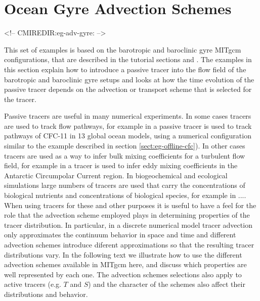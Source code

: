 


\section[Gyre Advection Example]{Ocean Gyre Advection Schemes}
\label{www:tutorials}
\label{sect:eg-adv-gyre}
\begin{rawhtml}
<!-- CMIREDIR:eg-adv-gyre: -->
\end{rawhtml}

This set of examples is based on the barotropic and baroclinic gyre MITgcm configurations,
that are described in the tutorial sections \label{sect:eg-baro} and \label{sect:eg-fourlayer}. 
The examples in this section explain how to introduce a passive tracer into the flow 
field of the barotropic and baroclinic gyre setups and looks at how the time evolution
of the passive tracer depends on the advection or transport scheme that is selected 
for the tracer. 

Passive tracers are useful in many numerical experiments. In some cases tracers are
used to track flow pathways, for example in \cite{Dutay02} a passive tracer is used
to track pathways of CFC-11 in 13 global ocean models, using a numerical
configuration similar to the example described in section \ref{sect:eg-offline-cfc}).
In other cases tracers are used as a way
to infer bulk mixing coefficients for a turbulent flow field, for example in 
\cite{marsh06} a tracer is used to infer eddy mixing coefficients in the
Antarctic Circumpolar Current region. In biogeochemical and ecological simulations large numbers 
of tracers are used that carry the concentrations of biological nutrients and concentrations of 
biological species, for example in ....
When using tracers for these and other purposes it is useful to have a feel for the role
that the advection scheme employed plays in determining properties of the tracer distribution.
In particular, in a discrete numerical model tracer advection only approximates the 
continuum behavior in space and time and different advection schemes introduce diferent 
approximations so that the resulting tracer distributions vary. In the following 
text we illustrate how
to use the different advection schemes available in MITgcm here, and discuss which properties 
are well represented by each one. The advection schemes selections also apply to active
tracers (e.g. $T$ and $S$) and the character of the schemes also affect their distributions
and behavior.

